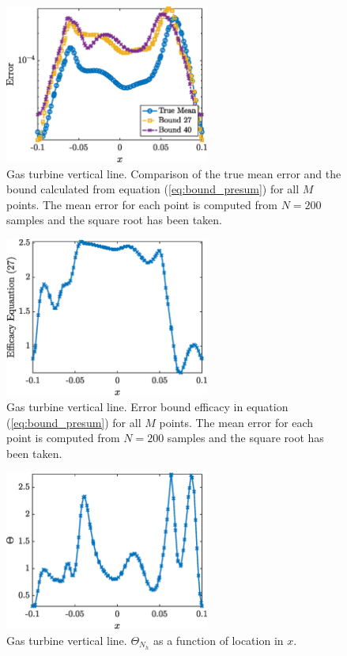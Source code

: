\documentclass{report}
\begin{document}
% 
\begin{figure}[ht!]
\centering
\includegraphics[width =0.6\textwidth]{Figures/GT_mid_eq_27_bound.eps}
\caption{Gas turbine vertical line. Comparison of the true mean error and the bound calculated from equation (\ref{eq:bound_presum}) for all $M$ points. The mean error for each point is computed from $N=200$ samples and the square root has been taken.} 
\label{fig:GT_mid_eq_27_bound}
\end{figure}
%

\begin{figure}[ht!]
\centering
\includegraphics[width =0.6\textwidth]{Figures/GT_mid_eq_27_efficacy.eps}
\caption{Gas turbine vertical line. Error bound efficacy in equation (\ref{eq:bound_presum}) for all $M$ points. The mean error for each point is computed from $N=200$ samples and the square root has been taken.} 
\label{fig:GT_mid_eq_27_efficacy}
\end{figure}
%

% 
\begin{figure}[ht!]
\centering
\includegraphics[width =0.6\textwidth]{Figures/GT_mid_theta.eps}
\caption{Gas turbine vertical line. $\Theta_{N_h}$ as a function of location in $x$.} 
\label{fig:GT_mid_theta}
\end{figure}
%
\end{document}
